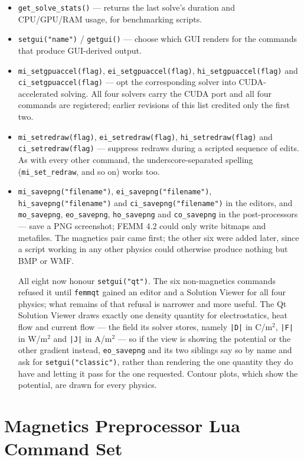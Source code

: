 \begin{itemize}
\item {\tt get\_solve\_stats()} --- returns the last solve's duration
and CPU/GPU/RAM usage, for benchmarking scripts.
\item {\tt setgui("name")} / {\tt getgui()} --- choose which GUI renders
for the commands that produce GUI-derived output.
\item {\tt mi\_setgpuaccel(flag)}, {\tt ei\_setgpuaccel(flag)},
{\tt hi\_setgpuaccel(flag)} and {\tt ci\_setgpuaccel(flag)} --- opt the
corresponding solver into CUDA-accelerated solving. All four solvers
carry the CUDA port and all four commands are registered; earlier
revisions of this list credited only the first two.
\item {\tt mi\_setredraw(flag)}, {\tt ei\_setredraw(flag)},
{\tt hi\_setredraw(flag)} and {\tt ci\_setredraw(flag)} --- suppress
redraws during a scripted sequence of edits. As with every other
command, the underscore-separated spelling ({\tt mi\_set\_redraw}, and
so on) works too.
\item {\tt mi\_savepng("filename")}, {\tt ei\_savepng("filename")},
{\tt hi\_savepng("filename")} and {\tt ci\_savepng("filename")} in the
editors, and {\tt mo\_savepng}, {\tt eo\_savepng}, {\tt ho\_savepng} and
{\tt co\_savepng} in the post-processors --- save a PNG screenshot; FEMM
4.2 could only write bitmaps and metafiles. The magnetics pair came
first; the other six were added later, since a script working in any
other physics could otherwise produce nothing but BMP or WMF.

All eight now honour {\tt setgui("qt")}. The six non-magnetics commands
refused it until {\tt femmqt} gained an editor and a Solution Viewer for
all four physics; what remains of that refusal is narrower and more
useful. The Qt Solution Viewer draws exactly one density quantity for
electrostatics, heat flow and current flow --- the field its solver
stores, namely {\tt |D|} in C/m$^2$, {\tt |F|} in W/m$^2$ and {\tt |J|}
in A/m$^2$ --- so if the view is showing the potential or the other
gradient instead, {\tt eo\_savepng} and its two siblings say so by name
and ask for {\tt setgui("classic")}, rather than rendering the one
quantity they do have and letting it pass for the one requested.
Contour plots, which show the potential, are drawn for every physics.
\end{itemize}


\section{Magnetics Preprocessor Lua Command Set}

